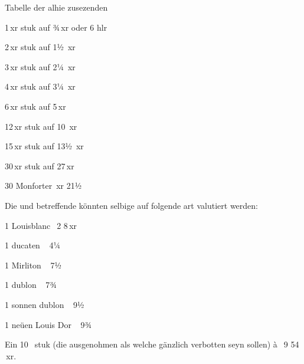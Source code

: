 \documentclass[10pt,twoside]{article}
\begin{document}
\begin{introlist}
{         
}
      
\end{introlist}


\begin{source} Tabelle der alhie zusezenden 
\vspace{1.5mm}

\noindent {}


                  1\,xr stuk
                     auf ¾\,xr
                     oder 6 hlr


                  2\,xr stuk
                     auf 1½
                       \,xr


                  3\,xr stuk
                     auf 2¼
                       \,xr


                  4\,xr stuk
                     auf 3¼
                       \,xr


                  6\,xr stuk
                     auf 5\,xr


                  12\,xr
                     stuk auf 10
                       \,xr


                  15\,xr
                     stuk auf 13½
                       \,xr


                  30\,xr stuk
                     auf 27\,xr


                  30 Monforter
                    \,xr 21½


\noindent Die  und  betreffende könnten selbige
                     auf folgende art valutiert werden:


                  1
                     Louisblanc
                    \,2
                        8\,xr


                  1
                     ducaten
                    \, 4¼
                  


                  1
                     Mirliton
                    \, 7½


                  1
                     dublon
                    \, 7¾
                  


                  1 sonnen
                     dublon
                    \, 9½


                  1 neüen Louis
                     Dor
                    \, 9¾


                  Ein 10\,
                     stuk (die  ausgenohmen als
                     welche gänzlich verbotten seyn sollen) à\, 9
                        54
                          \,xr. 


               
            
\end{source}








\printnotes*
\end{document}

